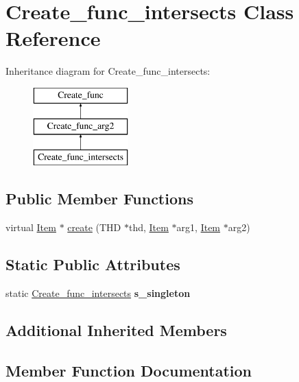 \hypertarget{classCreate__func__intersects}{}\section{Create\+\_\+func\+\_\+intersects Class Reference}
\label{classCreate__func__intersects}
Inheritance diagram for Create\+\_\+func\+\_\+intersects\+:\begin{figure}[H]
\begin{center}
\leavevmode
\includegraphics[height=3.000000cm]{classCreate__func__intersects}
\end{center}
\end{figure}
\subsection*{Public Member Functions}
\begin{DoxyCompactItemize}
\item 
virtual \mbox{\hyperlink{classItem}{Item}} $\ast$ \mbox{\hyperlink{classCreate__func__intersects_a598ca7a0f4d1d3f3859c5ee61b4129af}{create}} (T\+HD $\ast$thd, \mbox{\hyperlink{classItem}{Item}} $\ast$arg1, \mbox{\hyperlink{classItem}{Item}} $\ast$arg2)
\end{DoxyCompactItemize}
\subsection*{Static Public Attributes}
\begin{DoxyCompactItemize}
\item 
\mbox{\label{classCreate__func__intersects_a3f21376aaef4beb2226f6807856034f0}} 
static \mbox{\hyperlink{classCreate__func__intersects}{Create\+\_\+func\+\_\+intersects}} {\bfseries s\+\_\+singleton}
\end{DoxyCompactItemize}
\subsection*{Additional Inherited Members}


\subsection{Member Function Documentation}
\mbox{\label{classCreate__func__intersects_a598ca7a0f4d1d3f3859c5ee61b4129af}} 
